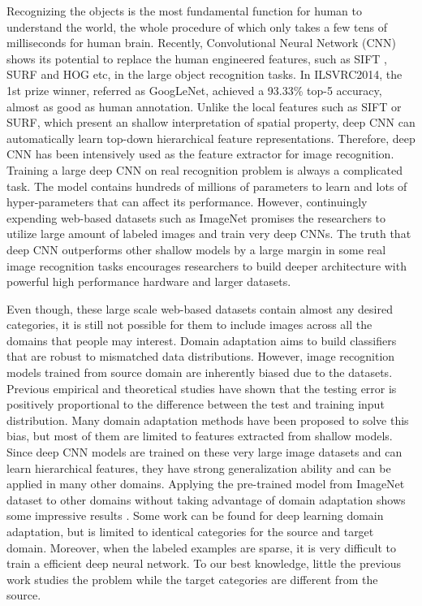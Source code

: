 ﻿Recognizing the objects is the most fundamental function for human to understand the world, the whole procedure of which only takes a few tens of milliseconds for human brain.
Recently, Convolutional Neural Network (CNN) shows its potential to replace the human engineered features, such as SIFT \cite{lowe1999object}, SURF \cite{bay2006surf} and HOG \cite{dalal2005histograms} etc, in the large object recognition tasks\cite{krizhevsky2012imagenet}\cite{zeiler2014visualizing}\cite{simonyan2014very}. In ILSVRC2014, the 1st prize winner, referred as GoogLeNet, achieved a 93.33\% top-5 accuracy, almost as good as human annotation\cite{szegedy2014going}.
Unlike the local features such as SIFT or SURF, which present an shallow interpretation of spatial property, deep CNN can automatically learn top-down hierarchical feature representations. Therefore, deep CNN has been intensively used as the feature extractor for image recognition\cite{farabet2013learning}.
Training a large deep CNN on real recognition problem is always a complicated task. The model contains hundreds of millions of parameters to learn and lots of hyper-parameters that can affect its performance. However, continuingly expending web-based datasets such as ImageNet promises the researchers to utilize large amount of labeled images and train very deep CNNs. The truth that deep CNN outperforms other shallow models by a large margin in some real image recognition tasks encourages researchers to build deeper architecture with powerful high performance hardware and larger datasets.

Even though, these large scale web-based datasets contain almost any desired categories, it is still not possible for them to include images across all the domains that people may interest.
Domain adaptation aims to build classifiers that are robust to mismatched data distributions. However, image recognition models trained from source domain are inherently biased due to the datasets. Previous empirical and theoretical studies have shown that the testing error is positively proportional to the difference between the test and training input distribution\cite{ben2007analysis}\cite{blitzer2008learning}. Many domain adaptation methods have been proposed to solve this bias, but most of them are limited to features extracted from shallow models\cite{daume2009frustratingly}\cite{yang2007adapting}\cite{aytar2011tabula}.
Since deep CNN models are trained on these very large image datasets and can learn hierarchical features, they have strong generalization ability and can be applied in many other domains. Applying the pre-trained model from ImageNet dataset to other domains without taking advantage of domain adaptation shows some impressive results\cite{Chatfield14} \cite{zeiler2014visualizing}. Some work can be found for deep learning domain adaptation, but is limited to identical categories for the source and target domain\cite{hoffman2013one}\cite{NIPS2014_Zhou}. Moreover, when the labeled examples are sparse, it is very difficult to train a efficient deep neural network. To our best knowledge, little the previous work studies the problem while the target categories are different from the source.

